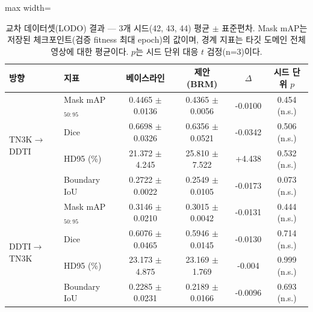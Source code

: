 \begin{table}[htbp]
\centering
\small
\caption[교차 데이터셋(LODO) 결과 — 3개 시드(42, 43, 44) 평균 $\pm$ 표준편차.]{교차 데이터셋(LODO) 결과 — 3개 시드(42, 43, 44) 평균 $\pm$ 표준편차. Mask mAP는 저장된 체크포인트(검증 fitness 최대 epoch)의 값이며, 경계 지표는 타깃 도메인 전체 영상에 대한 평균이다. $p$는 시드 단위 대응 $t$ 검정(n=3)이다.}
\label{tab:lodo}
\begin{adjustbox}{max width=\linewidth}
\begin{tabular}{llcccc}
\toprule
방향 & 지표 & 베이스라인 & 제안 (BRM) & $\Delta$ & 시드 단위 $p$ \\
\midrule
\multirow{4}{*}{TN3K$\rightarrow$DDTI} & Mask mAP$_{50:95}$ & 0.4465 $\pm$ 0.0136 & 0.4365 $\pm$ 0.0056 & -0.0100 & 0.454 (n.s.) \\
 & Dice & 0.6698 $\pm$ 0.0326 & 0.6356 $\pm$ 0.0521 & -0.0342 & 0.506 (n.s.) \\
 & HD95 (\%) & 21.372 $\pm$ 4.245 & 25.810 $\pm$ 7.522 & +4.438 & 0.532 (n.s.) \\
 & Boundary IoU & 0.2722 $\pm$ 0.0022 & 0.2549 $\pm$ 0.0105 & -0.0173 & 0.073 (n.s.) \\
\midrule
\multirow{4}{*}{DDTI$\rightarrow$TN3K} & Mask mAP$_{50:95}$ & 0.3146 $\pm$ 0.0210 & 0.3015 $\pm$ 0.0042 & -0.0131 & 0.444 (n.s.) \\
 & Dice & 0.6076 $\pm$ 0.0465 & 0.5946 $\pm$ 0.0145 & -0.0130 & 0.714 (n.s.) \\
 & HD95 (\%) & 23.173 $\pm$ 4.875 & 23.169 $\pm$ 1.769 & -0.004 & 0.999 (n.s.) \\
 & Boundary IoU & 0.2285 $\pm$ 0.0231 & 0.2189 $\pm$ 0.0166 & -0.0096 & 0.693 (n.s.) \\
\bottomrule
\end{tabular}
\end{adjustbox}
\end{table}

